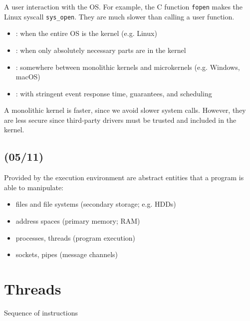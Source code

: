 \begin{defn}
  A user interaction with the OS.
  For example, the C function \verb|fopen| makes the Linux syscall
  \verb|sys_open|.
  They are much slower than calling a user function.
\end{defn}

\begin{defn*}
  \begin{itemize}[nosep]
    \item {}:
          when the entire OS is the kernel (e.g. Linux)
    \item {}:
          when only absolutely necessary parts are in the kernel
    \item {}:
          somewhere between monolithic kernels and microkernels (e.g. Windows, macOS)
    \item {}:
          with stringent event response time, guarantees, and scheduling
  \end{itemize}
\end{defn*}

A monolithic kernel is faster, since we avoid slower system calls.
However, they are less secure since third-party drivers must be trusted and included in the kernel.

\section{(05/11)}

Provided by the execution environment are abstract entities
that a program is able to manipulate:
\begin{itemize}[nosep]
  \item files and file systems (secondary storage; e.g. HDDs)
  \item address spaces (primary memory; RAM)
  \item processes, threads (program execution)
  \item sockets, pipes (message channels)
\end{itemize}

\chapter{Threads}

\begin{defn}[thread]
  Sequence of instructions
\end{defn}

